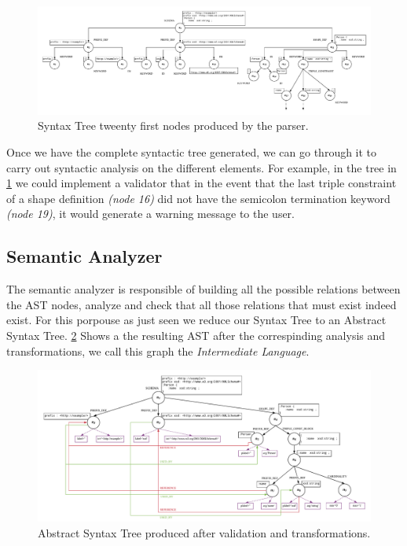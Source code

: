 \begin{figure}
    \includegraphics[width=\textwidth]{images/shex-lite-syntax-tree.pdf}
    \centering
    \caption[Syntax Tree tweenty first nodes produced by the parser]{Syntax Tree tweenty first nodes produced by the parser.}
    \label{fig:shex-lite-st}
\end{figure}

Once we have the complete syntactic tree generated, we can go through it to carry out syntactic analysis on the different elements.
For example, in the tree in \cref{fig:shex-lite-st} we could implement a validator that in the event that the last triple constraint
of a shape definition \textit{(node 16)} did not have the semicolon termination keyword \textit{(node 19)}, it would generate a
warning message to the user.

\subsection{Semantic Analyzer}
The semantic analyzer is responsible of building all the possible relations between the AST nodes, analyze and check that
all those relations that must exist indeed exist. For this porpouse as just seen we reduce our Syntax Tree to an
Abstract Syntax Tree. \cref{fig:shex-lite-sema-anal} Shows a the resulting AST after the correspinding analysis and
transformations, we call this graph the \textit{Intermediate Language}.

\begin{figure}
    \includegraphics[width=\textwidth]{images/shex-lite-sema-anal.pdf}
    \centering
    \caption[Abstract Syntax Tree produced after validation and transformations]{Abstract Syntax Tree produced after validation and
    transformations.}
    \label{fig:shex-lite-sema-anal}
\end{figure}

